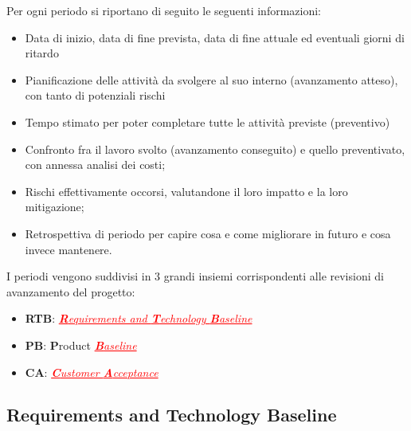\documentclass[italian,12pt]{article} %
\begin{document}
Per ogni periodo si riportano di seguito le seguenti informazioni:
\begin{itemize}
    \item Data di inizio, data di fine prevista, data di fine attuale ed eventuali giorni di ritardo
    \item Pianificazione delle attività da svolgere al suo interno (avanzamento atteso), con tanto di potenziali rischi
    \item Tempo stimato per poter completare tutte le attività previste (preventivo)
    \item Confronto fra il lavoro svolto (avanzamento conseguito) e quello preventivato, con annessa analisi dei costi;
    \item Rischi effettivamente occorsi, valutandone il loro impatto e la loro mitigazione;
    \item Retrospettiva di periodo per capire cosa e come migliorare in futuro e cosa invece mantenere.
\end{itemize}
I periodi vengono suddivisi in 3 grandi insiemi corrispondenti alle revisioni di avanzamento del progetto:
\begin{itemize}
    \item \textbf{RTB}: \textcolor{red}{\uline{\textit{\textbf{R}equirements and \textbf{T}echnology \textbf{B}aseline}}}
    \item \textbf{PB}:  \textbf{P}roduct \textcolor{red}{\uline{\textit{\textbf{B}aseline}}}
    \item \textbf{CA}:  \textcolor{red}{\uline{\textit{\textbf{C}ustomer \textbf{A}cceptance}}}
\end{itemize}

\subsection{Requirements and Technology Baseline}
\end{document}
